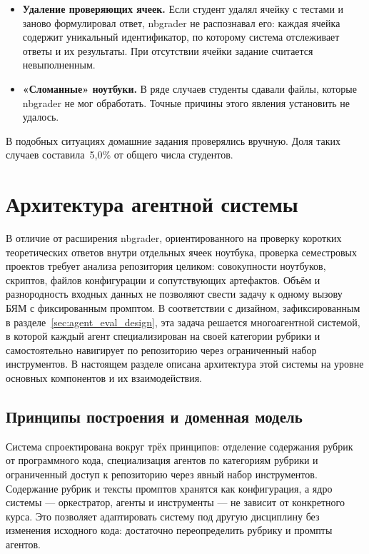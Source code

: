 \begin{itemize}
    \item \textbf{Удаление проверяющих ячеек.} Если студент удалял ячейку с тестами и заново формулировал ответ, nbgrader не распознавал его: каждая ячейка содержит уникальный идентификатор, по которому система отслеживает ответы и их результаты. При отсутствии ячейки задание считается невыполненным.

    \item \textbf{«Сломанные» ноутбуки.} В ряде случаев студенты сдавали файлы, которые nbgrader не мог обработать. Точные причины этого явления установить не удалось.
\end{itemize}

В подобных ситуациях домашние задания проверялись вручную. Доля таких случаев составила~5{,}0\% от общего числа студентов.

\section{Архитектура агентной системы}\label{sec:agent_architecture}

В отличие от расширения nbgrader, ориентированного на проверку коротких
теоретических ответов внутри отдельных ячеек ноутбука, проверка
семестровых проектов требует анализа репозитория целиком: совокупности
ноутбуков, скриптов, файлов конфигурации и сопутствующих артефактов.
Объём и разнородность входных данных не позволяют свести задачу к
одному вызову БЯМ с фиксированным промптом. В соответствии с дизайном,
зафиксированным в разделе~\ref{sec:agent_eval_design}, эта задача
решается многоагентной системой, в которой каждый агент специализирован
на своей категории рубрики и самостоятельно навигирует по репозиторию
через ограниченный набор инструментов. В настоящем разделе описана
архитектура этой системы на уровне основных компонентов и их
взаимодействия.

\subsection{Принципы построения и доменная модель}

Система спроектирована вокруг трёх принципов: отделение содержания
рубрик от программного кода, специализация агентов по категориям
рубрики и ограниченный доступ к репозиторию через явный набор
инструментов. Содержание рубрик и тексты промптов хранятся как
конфигурация, а ядро системы --- оркестратор, агенты и инструменты ---
не зависит от конкретного курса. Это позволяет адаптировать систему
под другую дисциплину без изменения исходного кода: достаточно
переопределить рубрику и промпты агентов.

